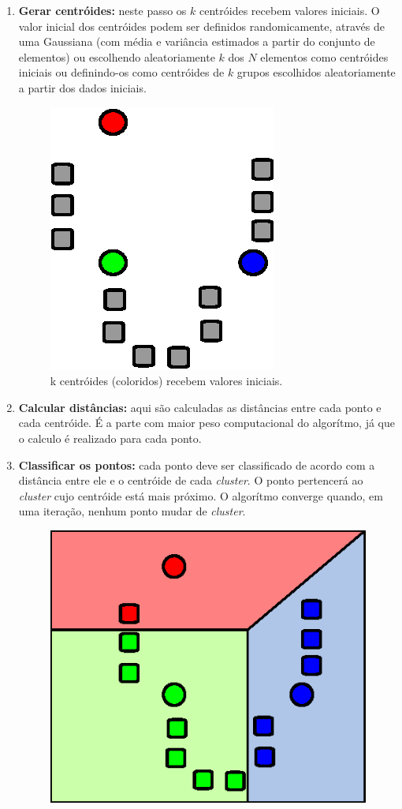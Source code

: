 \begin{enumerate}
  \item \textbf{Gerar centróides:} neste passo os \(k\) centróides recebem valores iniciais. O valor inicial dos centróides podem ser definidos randomicamente, através de uma Gaussiana (com média e variância estimados a partir do conjunto de elementos) ou escolhendo aleatoriamente \(k\) dos \(N\) elementos como centróides iniciais ou definindo-os como centróides de \(k\) grupos escolhidos aleatoriamente a partir dos dados iniciais.
  \begin{figure}[h]
    \centering
    \includegraphics[scale=0.6]{figuras/kmeans-1.eps}
    \caption{k centróides (coloridos) recebem valores iniciais.}
  \end{figure}
  \item \textbf{Calcular distâncias:} aqui são calculadas as distâncias entre cada ponto e cada centróide. É a parte com maior peso computacional do algorítmo, já que o calculo é realizado para cada ponto.
  \item \textbf{Classificar os pontos:} cada ponto deve ser classificado de acordo com a distância entre ele e o centróide de cada \textit{cluster}. O ponto pertencerá ao \textit{cluster} cujo centróide está mais próximo. O algorítmo converge quando, em uma iteração, nenhum ponto mudar de \textit{cluster}.
  \begin{figure}[h]
    \centering
    \includegraphics[scale=0.6]{figuras/kmeans-2.eps}

\end{figure}
\end{enumerate}
